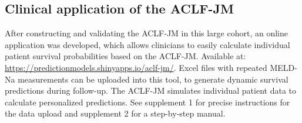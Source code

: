 \documentclass[11pt,english,]{book} %
\begin{document}
\hypertarget{clinical-application-of-the-aclf-jm-1}{%
\subsection*{Clinical application of the ACLF-JM}\label{clinical-application-of-the-aclf-jm-1}}

After constructing and validating the ACLF-JM in this large cohort, an online application was developed, which allows clinicians to easily calculate individual patient survival probabilities based on the ACLF-JM. Available at: \url{https://predictionmodels.shinyapps.io/aclf-jm/}. Excel files with repeated MELD-Na measurements can be uploaded into this tool, to generate dynamic survival predictions during follow-up. The ACLF-JM simulates individual patient data to calculate personalized predictions. See supplement 1 for precise instructions for the data upload and supplement 2 for a step-by-step manual.

\linespread{1}
\end{document}
